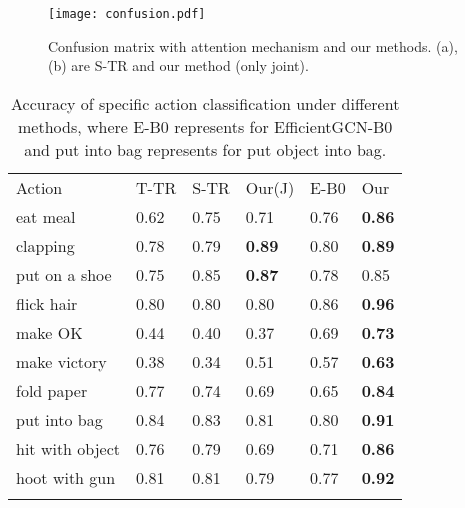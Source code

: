 \documentclass[letterpaper]{article} \usepackage[submission]{aaai23}  \usepackage{times}  \usepackage{helvet}  \usepackage{courier}  \usepackage[hyphens]{url}  \usepackage{graphicx} \urlstyle{rm} \def\UrlFont{\rm}  \usepackage{natbib}  \usepackage{caption} \frenchspacing  \setlength{\pdfpagewidth}{8.5in} \setlength{\pdfpageheight}{11in} \usepackage{algorithm}
\begin{document}
\begin{figure}[htp]
\texttt{[image: confusion.pdf]}
    \caption{Confusion matrix with attention mechanism and our methods. (a), (b) are S-TR and our method (only joint).}
    \label{fig:galaxyat}
\end{figure}
\begin{table}[htp]
 \centering
\begin{tabular}{llllll}
\hline\noalign{\smallskip}
Action&T-TR&S-TR&Our(J)&E-B0&Our\\
\noalign{\smallskip}\hline\noalign{\smallskip}
eat meal&0.62&0.75&0.71&0.76&{\bf 0.86}\\
clapping&0.78&0.79&{\bf0.89}&0.80&{\bf0.89}\\
put on a shoe&0.75&0.85&{\bf0.87}&0.78&0.85\\
flick hair&0.80&0.80&0.80&0.86&{\bf0.96}\\
make OK &0.44&0.40&0.37&0.69&{\bf0.73}\\
make victory &0.38&0.34&0.51&0.57&{\bf0.63}\\
fold paper&0.77&0.74&0.69&0.65&{\bf0.84}\\
put into bag&0.84&0.83&0.81&0.80&{\bf0.91}\\
hit with object&0.76&0.79&0.69&0.71&{\bf0.86}\\
hoot with gun&0.81&0.81&0.79&0.77&{\bf0.92}\\
\noalign{\smallskip}\hline
\end{tabular}\caption{Accuracy of specific action classification under different methods, where E-B0 represents for EfficientGCN-B0 and put into bag represents for put object into bag.}
\label{tab:12at}
\end{table}
\end{document}
